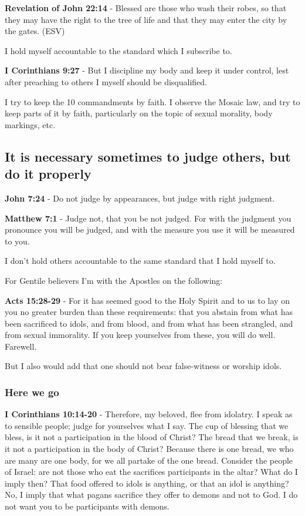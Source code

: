 \documentclass[11pt]{article}
\begin{document}
\textbf{Revelation of John 22:14} - Blessed are those who wash their robes, so that they may have the right to the tree of life and that they may enter the city by the gates. (ESV)

I hold myself accountable to the standard which I subscribe to.

\textbf{I Corinthians 9:27} - But I discipline my body and keep it under control, lest after preaching to others I myself should be disqualified.

I try to keep the 10 commandments by faith.
I observe the Mosaic law, and try to keep parts of it by faith, particularly
on the topic of sexual morality, body markings, etc.

\subsection{It is necessary sometimes to judge others, but do it properly}
\label{sec:org15375d8}
\textbf{John 7:24} - Do not judge by appearances, but judge with right judgment.

\textbf{Matthew 7:1} - Judge not, that you be not judged.  For with the judgment you pronounce you will be judged, and with the measure you use it will be measured to you.

I don't hold others accountable to the same standard that I hold myself to.

For Gentile believers I'm with the Apostles on the following:

\textbf{Acts 15:28-29} - For it has seemed good to the Holy Spirit and to us to lay on you no greater burden than these requirements: that you abstain from what has been sacrificed to idols, and from blood, and from what has been strangled, and from sexual immorality. If you keep yourselves from these, you will do well. Farewell.

But I also would add that one should not bear false-witness or worship idols.

\subsubsection{Here we go}
\label{sec:orgde671c8}
\textbf{I Corinthians 10:14-20} - Therefore, my beloved, flee from idolatry.  I speak as to sensible people; judge for yourselves what I say.  The cup of blessing that we bless, is it not a participation in the blood of Christ? The bread that we break, is it not a participation in the body of Christ?  Because there is one bread, we who are many are one body, for we all partake of the one bread.  Consider the people of Israel: are not those who eat the sacrifices participants in the altar?  What do I imply then? That food offered to idols is anything, or that an idol is anything?  No, I imply that what pagans sacrifice they offer to demons and not to God. I do not want you to be participants with demons.
\end{document}
